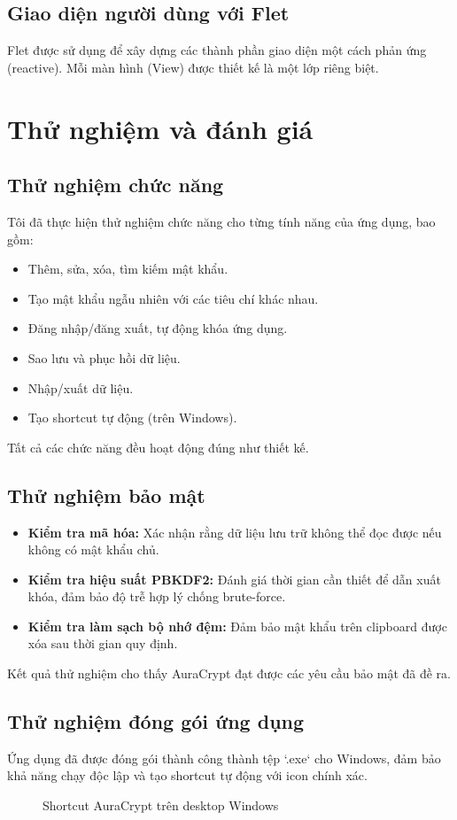 \subsection{Giao diện người dùng với Flet}
Flet được sử dụng để xây dựng các thành phần giao diện một cách phản ứng (reactive). Mỗi màn hình (View) được thiết kế là một lớp riêng biệt.


\section{Thử nghiệm và đánh giá}
\subsection{Thử nghiệm chức năng}
Tôi đã thực hiện thử nghiệm chức năng cho từng tính năng của ứng dụng, bao gồm:
\begin{itemize}
    \item Thêm, sửa, xóa, tìm kiếm mật khẩu.
    \item Tạo mật khẩu ngẫu nhiên với các tiêu chí khác nhau.
    \item Đăng nhập/đăng xuất, tự động khóa ứng dụng.
    \item Sao lưu và phục hồi dữ liệu.
    \item Nhập/xuất dữ liệu.
    \item Tạo shortcut tự động (trên Windows).
\end{itemize}
Tất cả các chức năng đều hoạt động đúng như thiết kế.

\subsection{Thử nghiệm bảo mật}
\begin{itemize}
    \item \textbf{Kiểm tra mã hóa:} Xác nhận rằng dữ liệu lưu trữ không thể đọc được nếu không có mật khẩu chủ.
    \item \textbf{Kiểm tra hiệu suất PBKDF2:} Đánh giá thời gian cần thiết để dẫn xuất khóa, đảm bảo độ trễ hợp lý chống brute-force.
    \item \textbf{Kiểm tra làm sạch bộ nhớ đệm:} Đảm bảo mật khẩu trên clipboard được xóa sau thời gian quy định.
\end{itemize}
Kết quả thử nghiệm cho thấy AuraCrypt đạt được các yêu cầu bảo mật đã đề ra.

\subsection{Thử nghiệm đóng gói ứng dụng}
Ứng dụng đã được đóng gói thành công thành tệp `.exe` cho Windows, đảm bảo khả năng chạy độc lập và tạo shortcut tự động với icon chính xác.
\begin{figure}[H]
    \centering
    \caption{Shortcut AuraCrypt trên desktop Windows}
    \label{fig:desktop_shortcut}
\end{figure}
\newpage